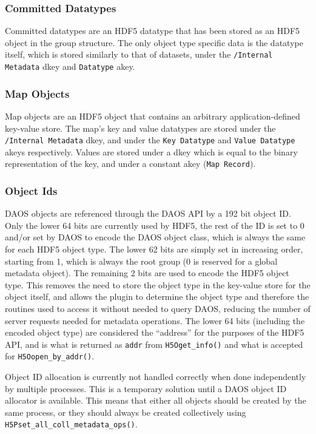 \subsubsection{Committed Datatypes}

Committed datatypes are an HDF5 datatype that has been stored as an HDF5 object in the group structure. The only object type specific data is the datatype itself, which is stored similarly to that of datasets, under the \verb+/Internal Metadata+ dkey and \verb+Datatype+ akey.

\subsubsection{Map Objects}

Map objects are an HDF5 object that contains an arbitrary application-defined key-value store. The map’s key and value datatypes are stored under the \verb+/Internal Metadata+ dkey, and under the \verb+Key Datatype+ and \verb+Value Datatype+ akeys respectively. Values are stored under a dkey which is equal to the binary representation of the key, and under a constant akey (\verb+Map Record+).

\subsubsection{Object Ids}

DAOS objects are referenced through the DAOS API by a 192 bit object ID. Only the lower 64 bits are currently used by HDF5, the rest of the ID is set to 0 and/or set by DAOS to encode the DAOS object class, which is always the same for each HDF5 object type. The lower 62 bits are simply set in increasing order, starting from 1, which is always the root group (0 is reserved for a global metadata object). The remaining 2 bits are used to encode the HDF5 object type. This
removes the need to store the object type in the key-value store for the object itself, and allows the plugin to determine the object type and therefore the routines used to access it without needed to query DAOS, reducing the number of server requests needed for metadata operations. The lower 64 bits (including the encoded object type) are considered the “address” for the purposes of the HDF5 API, and is what is returned as \verb+addr+ from \verb+H5Oget_info()+ and what is accepted for \verb+H5Oopen_by_addr()+.

Object ID allocation is currently not handled correctly when done independently by multiple processes. This is a temporary solution until a DAOS object ID allocator is available. This means that either all objects should be created by the same process, or they should always be created collectively using \verb+H5Pset_all_coll_metadata_ops()+.

